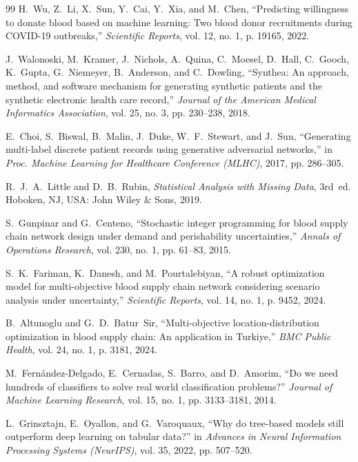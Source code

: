 \documentclass[conference]{IEEEtran}
\begin{document}
\begin{thebibliography}{99}
H.~Wu, Z.~Li, X.~Sun, Y.~Cai, Y.~Xia, and M.~Chen, ``Predicting willingness to donate blood based on machine learning: Two blood donor recruitments during COVID-19 outbreaks,'' \textit{Scientific Reports}, vol. 12, no. 1, p. 19165, 2022.

J.~Walonoski, M.~Kramer, J.~Nichols, A.~Quina, C.~Moesel, D.~Hall, C.~Gooch, K.~Gupta, G.~Niemeyer, B.~Anderson, and C.~Dowling, ``Synthea: An approach, method, and software mechanism for generating synthetic patients and the synthetic electronic health care record,'' \textit{Journal of the American Medical Informatics Association}, vol. 25, no. 3, pp. 230--238, 2018.

E.~Choi, S.~Biswal, B.~Malin, J.~Duke, W.~F.~Stewart, and J.~Sun, ``Generating multi-label discrete patient records using generative adversarial networks,'' in \textit{Proc. Machine Learning for Healthcare Conference (MLHC)}, 2017, pp. 286--305.

R.~J.~A.~Little and D.~B.~Rubin, \textit{Statistical Analysis with Missing Data}, 3rd~ed. Hoboken, NJ, USA: John Wiley \& Sons, 2019.

S.~Gunpinar and G.~Centeno, ``Stochastic integer programming for blood supply chain network design under demand and perishability uncertainties,'' \textit{Annals of Operations Research}, vol. 230, no. 1, pp. 61--83, 2015.

S.~K.~Fariman, K.~Danesh, and M.~Pourtalebiyan, ``A robust optimization model for multi-objective blood supply chain network considering scenario analysis under uncertainty,'' \textit{Scientific Reports}, vol. 14, no. 1, p. 9452, 2024.

B.~Altunoglu and G.~D.~Batur~Sir, ``Multi-objective location-distribution optimization in blood supply chain: An application in Turkiye,'' \textit{BMC Public Health}, vol. 24, no. 1, p. 3181, 2024.

M.~Fern{\'a}ndez-Delgado, E.~Cernadas, S.~Barro, and D.~Amorim, ``Do we need hundreds of classifiers to solve real world classification problems?'' \textit{Journal of Machine Learning Research}, vol. 15, no. 1, pp. 3133--3181, 2014.

L.~Grinsztajn, E.~Oyallon, and G.~Varoquaux, ``Why do tree-based models still outperform deep learning on tabular data?'' in \textit{Advances in Neural Information Processing Systems (NeurIPS)}, vol. 35, 2022, pp. 507--520.


\end{thebibliography}
\end{document}
